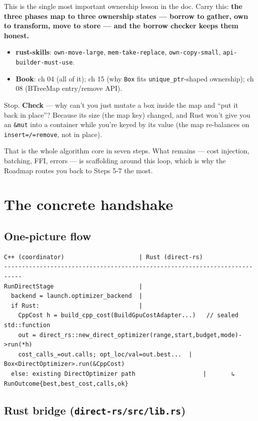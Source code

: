 \documentclass[11pt]{article}
\begin{document}
This is the single most important ownership lesson in the doc. Carry this:
\textbf{\textbf{the three phases map to three ownership states — borrow to gather, own to
transform, move to store — and the borrow checker keeps them honest.}}

\begin{itemize}
\item \textbf{\textbf{rust-skills}}: \texttt{own-move-large}, \texttt{mem-take-replace}, \texttt{own-copy-small},
\texttt{api-builder-must-use}.
\item \textbf{\textbf{Book}}: ch 04 (all of it); ch 15 (why \texttt{Box} fits \texttt{unique\_ptr}-shaped
ownership); ch 08 (BTreeMap entry/remove API).
\end{itemize}

Stop. \textbf{\textbf{Check}} — why can't you just mutate a box inside the map and ``put it
back in place''? Because its size (the map key) changed, and Rust won't give you
an \texttt{\&mut} into a container while you're keyed by its value (the map re-balances
on \texttt{insert=/=remove}, not in place).

That is the whole algorithm core in seven steps. What remains — cost injection,
batching, FFI, errors — is scaffolding around this loop, which is why the
Roadmap routes you back to Steps 5-7 the most.
\section{The concrete handshake}
\label{sec:org55273f9}

\subsection{One-picture flow}
\label{sec:org34f0fba}

\begin{verbatim}
C++ (coordinator)                     | Rust (direct-rs)
---------------------------------------------------------------------------
RunDirectStage                        |
  backend = launch.optimizer_backend  |
  if Rust:                            |
    CppCost h = build_cpp_cost(BuildGpuCostAdapter...)   // sealed std::function
    out = direct_rs::new_direct_optimizer(range,start,budget,mode)->run(*h)
    cost_calls_=out.calls; opt_loc/val=out.best...  |  Box<DirectOptimizer>.run(&CppCost)
  else: existing DirectOptimizer path                   |       ↳ RunOutcome{best,best_cost,calls,ok}
\end{verbatim}
\subsection{Rust bridge (\texttt{direct-rs/src/lib.rs})}
\label{sec:orgc0add40}
\end{document}
